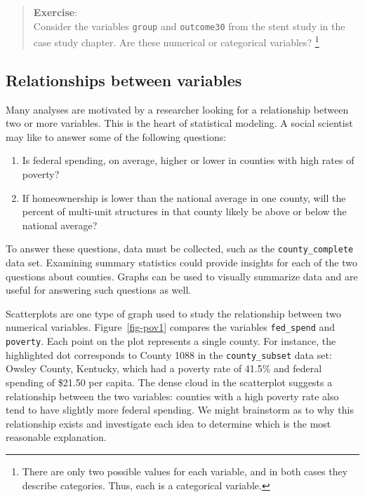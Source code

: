 \documentclass[
  letterpaper,
  DIV=11,
  numbers=noendperiod]{scrreprt}
\providecommand{\tightlist}{%
  \setlength{\itemsep}{0pt}\setlength{\parskip}{0pt}}\usepackage{longtable,booktabs,array}
\begin{document}
\begin{quote}
\textbf{Exercise}:\\
Consider the variables \texttt{group} and \texttt{outcome30} from the
stent study in the case study chapter. Are these numerical or
categorical variables? \footnote{There are only two possible values for
  each variable, and in both cases they describe categories. Thus, each
  is a categorical variable.}
\end{quote}

\subsection{Relationships between
variables}\label{relationships-between-variables}

Many analyses are motivated by a researcher looking for a relationship
between two or more variables. This is the heart of statistical
modeling. A social scientist may like to answer some of the following
questions:

\begin{enumerate}
\def\labelenumi{\arabic{enumi}.}
\tightlist
\item
  Is federal spending, on average, higher or lower in counties with high
  rates of poverty?\\
\item
  If homeownership is lower than the national average in one county,
  will the percent of multi-unit structures in that county likely be
  above or below the national average?
\end{enumerate}

To answer these questions, data must be collected, such as the
\texttt{county\_complete} data set. Examining summary statistics could
provide insights for each of the two questions about counties. Graphs
can be used to visually summarize data and are useful for answering such
questions as well.

Scatterplots are one type of graph used to study the relationship
between two numerical variables. Figure~\ref{fig-pov1} compares the
variables \texttt{fed\_spend} and \texttt{poverty}. Each point on the
plot represents a single county. For instance, the highlighted dot
corresponds to County 1088 in the \texttt{county\_subset} data set:
Owsley County, Kentucky, which had a poverty rate of 41.5\% and federal
spending of \$21.50 per capita. The dense cloud in the scatterplot
suggests a relationship between the two variables: counties with a high
poverty rate also tend to have slightly more federal spending. We might
brainstorm as to why this relationship exists and investigate each idea
to determine which is the most reasonable explanation.
\end{document}
